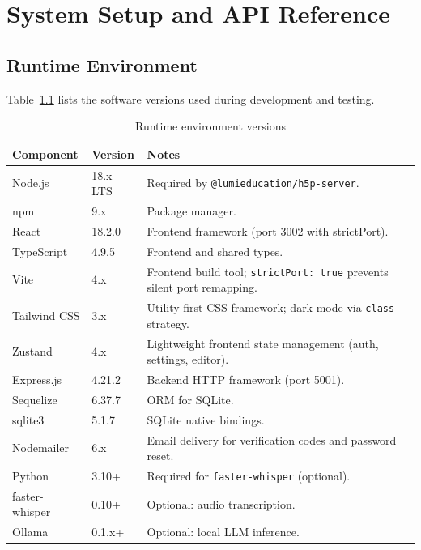 \chapter{System Setup and API Reference}

\section{Runtime Environment}

Table~\ref{tab:runtime} lists the software versions used during development
and testing.

\begin{table}[H]
  \centering
  \caption{Runtime environment versions}
  \label{tab:runtime}
  \begin{tabularx}{\linewidth}{llX}
    \toprule
    \textbf{Component} & \textbf{Version} & \textbf{Notes} \\
    \midrule
    Node.js      & 18.x LTS        & Required by \texttt{@lumieducation/h5p-server}. \\
    npm          & 9.x              & Package manager. \\
    React        & 18.2.0           & Frontend framework (port 3002 with strictPort). \\
    TypeScript   & 4.9.5            & Frontend and shared types. \\
    Vite         & 4.x              & Frontend build tool; \texttt{strictPort: true} prevents silent port remapping. \\
    Tailwind CSS & 3.x              & Utility-first CSS framework; dark mode via \texttt{class} strategy. \\
    Zustand      & 4.x              & Lightweight frontend state management (auth, settings, editor). \\
    Express.js   & 4.21.2           & Backend HTTP framework (port 5001). \\
    Sequelize    & 6.37.7           & ORM for SQLite. \\
    sqlite3      & 5.1.7            & SQLite native bindings. \\
    Nodemailer   & 6.x              & Email delivery for verification codes and password reset. \\
    Python       & 3.10+            & Required for \texttt{faster-whisper} (optional). \\
    faster-whisper & 0.10+          & Optional: audio transcription. \\
    Ollama       & 0.1.x+           & Optional: local LLM inference. \\
    \bottomrule
  \end{tabularx}
\end{table}

